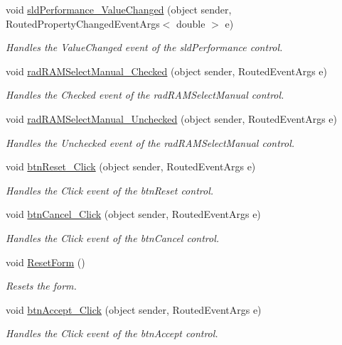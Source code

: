 \begin{DoxyCompactItemize}
\item 
void \hyperlink{class_p_c_builder_forms_1_1_questionnaire_a4c5659e3c84f9eb08287fa86ad3a4684}{sld\+Performance\+\_\+\+Value\+Changed} (object sender, Routed\+Property\+Changed\+Event\+Args$<$ double $>$ e)
\begin{DoxyCompactList}\small\item\em Handles the Value\+Changed event of the sld\+Performance control. \end{DoxyCompactList}\item 
void \hyperlink{class_p_c_builder_forms_1_1_questionnaire_abd5934363e01fc284501e7dca14cf0e1}{rad\+R\+A\+M\+Select\+Manual\+\_\+\+Checked} (object sender, Routed\+Event\+Args e)
\begin{DoxyCompactList}\small\item\em Handles the Checked event of the rad\+R\+A\+M\+Select\+Manual control. \end{DoxyCompactList}\item 
void \hyperlink{class_p_c_builder_forms_1_1_questionnaire_aafa36d5d99af61aec682aadc59f6b6b7}{rad\+R\+A\+M\+Select\+Manual\+\_\+\+Unchecked} (object sender, Routed\+Event\+Args e)
\begin{DoxyCompactList}\small\item\em Handles the Unchecked event of the rad\+R\+A\+M\+Select\+Manual control. \end{DoxyCompactList}\item 
void \hyperlink{class_p_c_builder_forms_1_1_questionnaire_a95e76d557be209143133d97d71e40bdd}{btn\+Reset\+\_\+\+Click} (object sender, Routed\+Event\+Args e)
\begin{DoxyCompactList}\small\item\em Handles the Click event of the btn\+Reset control. \end{DoxyCompactList}\item 
void \hyperlink{class_p_c_builder_forms_1_1_questionnaire_a21b5d339c61d10bdc83bdac62cebccd6}{btn\+Cancel\+\_\+\+Click} (object sender, Routed\+Event\+Args e)
\begin{DoxyCompactList}\small\item\em Handles the Click event of the btn\+Cancel control. \end{DoxyCompactList}\item 
void \hyperlink{class_p_c_builder_forms_1_1_questionnaire_a57d92628463485e31d68831240f1a97d}{Reset\+Form} ()
\begin{DoxyCompactList}\small\item\em Resets the form. \end{DoxyCompactList}\item 
void \hyperlink{class_p_c_builder_forms_1_1_questionnaire_a2000ae75279c69732241fe71e4b66b89}{btn\+Accept\+\_\+\+Click} (object sender, Routed\+Event\+Args e)
\begin{DoxyCompactList}\small\item\em Handles the Click event of the btn\+Accept control. \end{DoxyCompactList}\end{DoxyCompactItemize}
